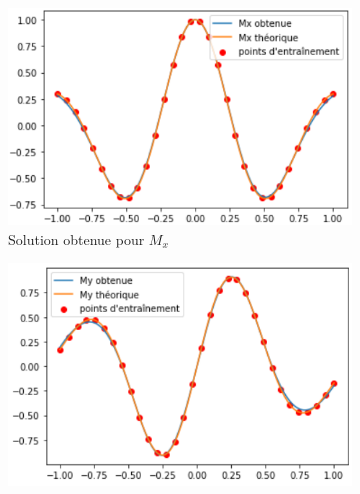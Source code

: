 \documentclass[12pt]{report}
\begin{document}
\begin{figure}
    \centering
    \begin{subfigure}[b]{0.4\textwidth}
        \centering
        \includegraphics[width=1\textwidth, height=0.9\textwidth]{Mx_3NN.PNG}
        \caption{Solution obtenue pour $M_x$}
    \end{subfigure}
    \hfill
    \begin{subfigure}[b]{0.4\textwidth}
        \centering
        \includegraphics[width=1\textwidth, height=0.9\textwidth]{My_3NN.PNG}

\end{subfigure}
\end{figure}
\end{document}
